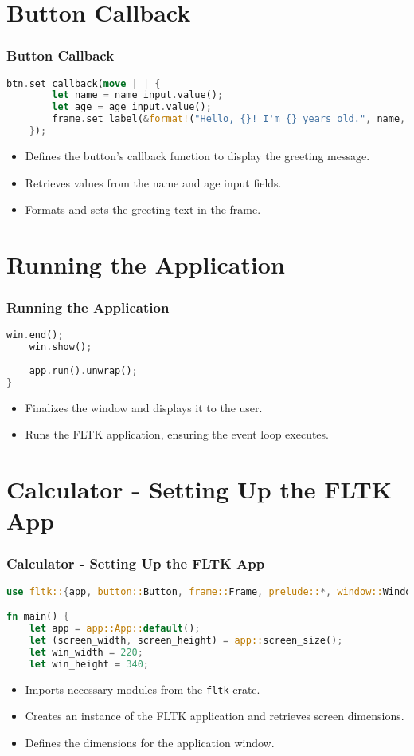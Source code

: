 \documentclass[aspectratio=169, table]{beamer}
\begin{document}
\section{Button Callback}
\begin{frame}[fragile]
\frametitle{Button Callback}
\begin{lstlisting}[language=Rust]
	btn.set_callback(move |_| {
		let name = name_input.value();
		let age = age_input.value();
		frame.set_label(&format!("Hello, {}! I'm {} years old.", name, age));
	});
\end{lstlisting}
\begin{itemize}
	\item Defines the button's callback function to display the greeting message.
	\item Retrieves values from the name and age input fields.
	\item Formats and sets the greeting text in the frame.
\end{itemize}
\end{frame}

\section{Running the Application}
\begin{frame}[fragile]
\frametitle{Running the Application}
\begin{lstlisting}[language=Rust]
	win.end();
	win.show();
	
	app.run().unwrap();
}
\end{lstlisting}
\begin{itemize}
\item Finalizes the window and displays it to the user.
\item Runs the FLTK application, ensuring the event loop executes.
\end{itemize}
\end{frame}

\section{Calculator - Setting Up the FLTK App}
\begin{frame}[fragile]
\frametitle{Calculator - Setting Up the FLTK App}
\begin{lstlisting}[language=Rust]
use fltk::{app, button::Button, frame::Frame, prelude::*, window::Window};

fn main() {
	let app = app::App::default();
	let (screen_width, screen_height) = app::screen_size();
	let win_width = 220;
	let win_height = 340;
\end{lstlisting}
\begin{itemize}
	\item Imports necessary modules from the \texttt{fltk} crate.
	\item Creates an instance of the FLTK application and retrieves screen dimensions.
	\item Defines the dimensions for the application window.
\end{itemize}
\end{frame}
\end{document}
